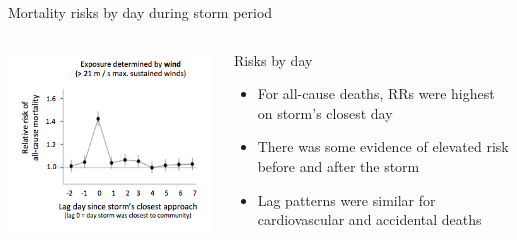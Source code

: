 \documentclass[ignorenonframetext,]{beamer}
\begin{document}
\begin{frame}{Mortality risks by day during storm period}

\begin{columns}
\begin{column}{0.6\textwidth}  
    \begin{center}
     \includegraphics[width=\textwidth]{all_cause_lags.png}
     \end{center}
\end{column}
\begin{column}{0.4\textwidth}
\footnotesize
\begin{block}{Risks by day}
\footnotesize
\begin{itemize}
  \item For all-cause deaths, RRs were highest on storm's closest day
  \item There was some evidence of elevated risk before and after the storm
  \item Lag patterns were similar for cardiovascular and accidental deaths
\end{itemize}
\end{block}
\end{column}
\end{columns}

\end{frame}
\end{document}
